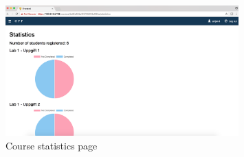\begin{figure}[H]
\centering
\includegraphics[width=0.8\textwidth]{img/gppinpictures/statistics.png}
\caption{Course statistics page}
\label{fig:statistics}
\end{figure}
